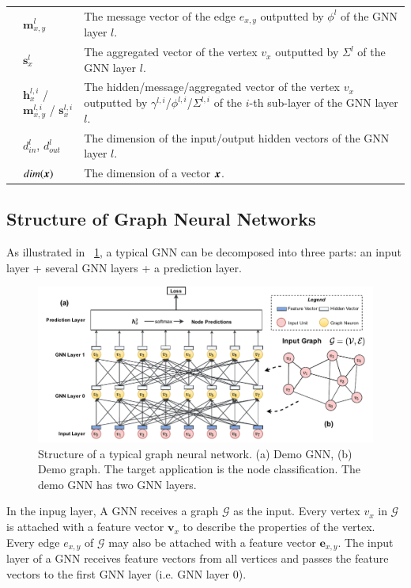 \begin{table}[h]
\begin{tabular}{p{3em}lp{35em}}
        & $\boldsymbol{m}_{x,y}^l$ & The message vector of the edge $e_{x,y}$ outputted by $\phi^l$ of the GNN layer $l$. \\
        & $\boldsymbol{s}_{x}^l$ & The aggregated vector of the vertex $v_x$ outputted by $\Sigma^l$ of the GNN layer $l$. \\
        & $\boldsymbol{h}_{x}^{l,i}$ / $\boldsymbol{m}_{x,y}^{l,i}$ / $\boldsymbol{s}_{x}^{l,i}$ & The hidden/message/aggregated vector of the vertex $v_x$ outputted by $\gamma^{l,i}$/$\phi^{l,i}$/$\Sigma^{l,i}$ of the $i$-th sub-layer of the GNN layer $l$. \\
        & $d^l_{in}$, $d^l_{out}$ &  The dimension of the input/output hidden vectors of the GNN layer $l$. \\
        & $dim(\boldsymbol{x})$ & The dimension of a vector $\boldsymbol{x}$. \\
        \bottomrule
    \end{tabular}
\end{table}

\subsection{Structure of Graph Neural Networks}

As illustrated in \figurename~\ref{fig:general_structure_of_gnn}, a typical GNN can be decomposed into three parts: an input layer + several GNN layers + a prediction layer.

\begin{figure}[h]
    \centering
    \includegraphics[width=0.95\columnwidth]{figs/illustration/GNN_common_architecture.pdf}
    \caption{Structure of a typical graph neural network. (a) Demo GNN, (b) Demo graph. The target application is the node classification. The demo GNN has two GNN layers.}
    \label{fig:general_structure_of_gnn}
\end{figure}

In the inpug layer, A GNN receives a graph $\mathcal{G}$ as the input.
%
Every vertex $v_x$ in $\mathcal{G}$ is attached with a feature vector $\boldsymbol{v}_x$ to describe the properties of the vertex.
%
Every edge $e_{x,y}$ of $\mathcal{G}$ may also be attached with a feature vector $\boldsymbol{e}_{x,y}$.
%
The input layer of a GNN receives feature vectors from all vertices and passes the feature vectors to the first GNN layer (i.e. GNN layer 0).

